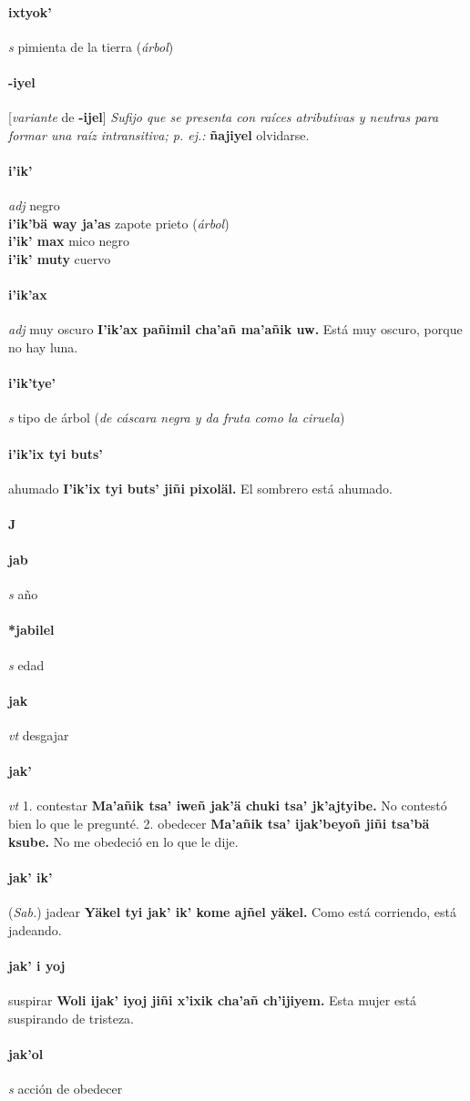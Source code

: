 \documentclass{scrbook}
\newcommand{\entry}[1]{\paragraph{#1}}
\newcommand{\alphaletter}[1]{\addsec{#1}}
\newcommand{\onedefinition}[1]{#1.}
\newcommand{\nontranslationdef}[1]{\textit{#1}}
\newcommand{\partofspeech}[1]{\textit{#1}}
\newcommand{\spanishtranslation}[1]{#1}
\newcommand{\clarification}[1]{(\textit{#1})}
\newcommand{\cholexample}[1]{\textbf{#1}}
\newcommand{\exampletranslation}[1]{#1}
\newcommand{\relevantdialect}[1]{(\textit{#1})}
\newcommand{\secondaryentry}[1]{\\\textbf{#1}}
\newcommand{\secondtranslation}[1]{#1}
\newcommand{\conjugationtense}[1]{[\textit{#1}}
\newcommand{\conjugationverb}[1]{de \textbf{#1}]}
\begin{document}
\begin{multicols}{2}
\entry{ixtyok'}
\partofspeech{s}
\spanishtranslation{pimienta de la tierra}
\clarification{árbol}

\entry{-iyel}
\conjugationtense{variante}
\conjugationverb{-ijel}
\nontranslationdef{Sufijo que se presenta con raíces atributivas y neutras para formar una raíz intransitiva; p. ej.:}
\cholexample{ñajiyel}
\exampletranslation{olvidarse.}

\entry{i'ik'}
\partofspeech{adj}
\spanishtranslation{negro}
\secondaryentry{i'ik'bä way ja'as}
\secondtranslation{zapote prieto}
\clarification{árbol}
\secondaryentry{i'ik' max}
\secondtranslation{mico negro}
\secondaryentry{i'ik' muty}
\secondtranslation{cuervo}

\entry{i'ik'ax}
\partofspeech{adj}
\spanishtranslation{muy oscuro}
\cholexample{I'ik'ax pañimil cha'añ ma'añik uw.}
\exampletranslation{Está muy oscuro, porque no hay luna.}

\entry{i'ik'tye'}
\partofspeech{s}
\spanishtranslation{tipo de árbol}
\clarification{de cáscara negra y da fruta como la ciruela}

\entry{i'ik'ix tyi buts'}
\spanishtranslation{ahumado}
\cholexample{I'ik'ix tyi buts' jiñi pixoläl.}
\exampletranslation{El sombrero está ahumado.}

\entry{J}
\alphaletter{J}

\entry{jab}
\partofspeech{s}
\spanishtranslation{año}

\entry{*jabilel}
\partofspeech{s}
\spanishtranslation{edad}

\entry{jak}
\partofspeech{vt}
\spanishtranslation{desgajar}

\entry{jak'}
\partofspeech{vt}
\onedefinition{1}
\spanishtranslation{contestar}
\cholexample{Ma'añik tsa' iweñ jak'ä chuki tsa' jk'ajtyibe.}
\exampletranslation{No contestó bien lo que le pregunté.}
\onedefinition{2}
\spanishtranslation{obedecer}
\cholexample{Ma'añik tsa' ijak'beyoñ jiñi tsa'bä ksube.}
\exampletranslation{No me obedeció en lo que le dije.}

\entry{jak' ik'}
\relevantdialect{Sab.}
\spanishtranslation{jadear}
\cholexample{Yäkel tyi jak' ik' kome ajñel yäkel.}
\exampletranslation{Como está corriendo, está jadeando.}

\entry{jak' i yoj}
\spanishtranslation{suspirar}
\cholexample{Woli ijak' iyoj jiñi x'ixik cha'añ ch'ijiyem.}
\exampletranslation{Esta mujer está suspirando de tristeza.}

\entry{jak'ol}
\partofspeech{s}
\spanishtranslation{acción de obedecer}


\end{multicols}
\end{document}
